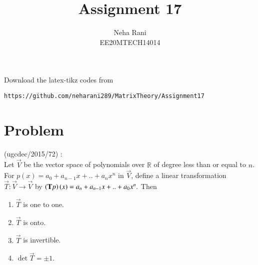 \documentclass[journal,12pt]{IEEEtran}
\begin{document}
     \def\rightbox#1{\makebox[0in][r]{#1}}
     \def\centbox#1{\makebox[0in]{#1}}
     \def\topbox#1{\raisebox{-\baselineskip}[0in][0in]{#1}}
     \def\midbox#1{\raisebox{-0.5\baselineskip}[0in][0in]{#1}}
\vspace{3cm}
\title{Assignment 17}
\author{Neha Rani\\EE20MTECH14014}
\maketitle
\bigskip
\renewcommand{\thefigure}{\theenumi}
\renewcommand{\thetable}{\theenumi}
%
Download the latex-tikz codes from 
%
\begin{lstlisting}
https://github.com/neharani289/MatrixTheory/Assignment17
\end{lstlisting}
\section{\textbf{Problem}}
%
 (ugcdec/2015/72) :\\
Let $\vec{V}$ be the vector space of polynomials over $\mathbb{R}$ of degree less than or equal to $n$. For $p(x)=a_0+a_{n-1}x+..+a_nx^{n}$ in $\vec{V}$, define a linear transformation $\vec{T}:\vec{V}\rightarrow \vec{V}$ by $\left(\mathbf{T}p\right)(x)=a_n+a_{n-1}x+..+a_0x^n.$ Then \\
\begin{enumerate}
    \item $\vec{T}$ is one to one.
    \item $\vec{T}$ is onto.
    \item $\vec{T}$ is invertible.
    \item $\det{\vec{T}}=\pm 1$.
\end{enumerate}
\end{document}
